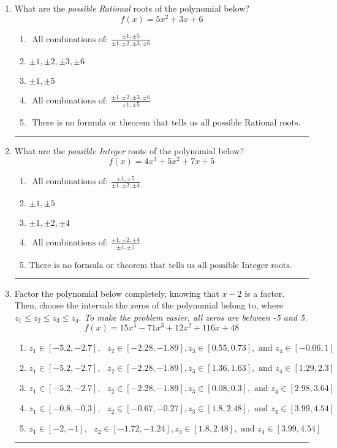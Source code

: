 \documentclass[14pt]{extbook}
\newcommand{\litem}[1]{\item#1\hspace*{-1cm}\rule{\textwidth}{0.4pt}}
\begin{document}
\begin{enumerate}
\litem{
What are the \textit{possible Rational} roots of the polynomial below?\[ f(x) = 5x^{2} +3 x + 6 \]\begin{enumerate}[label=\Alph*.]
\item \( \text{ All combinations of: }\frac{\pm 1,\pm 5}{\pm 1,\pm 2,\pm 3,\pm 6} \)
\item \( \pm 1,\pm 2,\pm 3,\pm 6 \)
\item \( \pm 1,\pm 5 \)
\item \( \text{ All combinations of: }\frac{\pm 1,\pm 2,\pm 3,\pm 6}{\pm 1,\pm 5} \)
\item \( \text{ There is no formula or theorem that tells us all possible Rational roots.} \)

\end{enumerate} }
\litem{
What are the \textit{possible Integer} roots of the polynomial below?\[ f(x) = 4x^{3} +5 x^{2} +7 x + 5 \]\begin{enumerate}[label=\Alph*.]
\item \( \text{ All combinations of: }\frac{\pm 1,\pm 5}{\pm 1,\pm 2,\pm 4} \)
\item \( \pm 1,\pm 5 \)
\item \( \pm 1,\pm 2,\pm 4 \)
\item \( \text{ All combinations of: }\frac{\pm 1,\pm 2,\pm 4}{\pm 1,\pm 5} \)
\item \( \text{There is no formula or theorem that tells us all possible Integer roots.} \)

\end{enumerate} }
\litem{
Factor the polynomial below completely, knowing that $x -2$ is a factor. Then, choose the intervals the zeros of the polynomial belong to, where $z_1 \leq z_2 \leq z_3 \leq z_4$. \textit{To make the problem easier, all zeros are between -5 and 5.}\[ f(x) = 15x^{4} -71 x^{3} +12 x^{2} +116 x + 48 \]\begin{enumerate}[label=\Alph*.]
\item \( z_1 \in [-5.2, -2.7], \text{   }  z_2 \in [-2.28, -1.89], z_3 \in [0.55, 0.73], \text{   and   } z_4 \in [-0.06, 1] \)
\item \( z_1 \in [-5.2, -2.7], \text{   }  z_2 \in [-2.28, -1.89], z_3 \in [1.36, 1.63], \text{   and   } z_4 \in [1.29, 2.3] \)
\item \( z_1 \in [-5.2, -2.7], \text{   }  z_2 \in [-2.28, -1.89], z_3 \in [0.08, 0.3], \text{   and   } z_4 \in [2.98, 3.64] \)
\item \( z_1 \in [-0.8, -0.3], \text{   }  z_2 \in [-0.67, -0.27], z_3 \in [1.8, 2.48], \text{   and   } z_4 \in [3.99, 4.54] \)
\item \( z_1 \in [-2, -1], \text{   }  z_2 \in [-1.72, -1.24], z_3 \in [1.8, 2.48], \text{   and   } z_4 \in [3.99, 4.54] \)


\end{enumerate}}
\end{enumerate}
\end{document}
